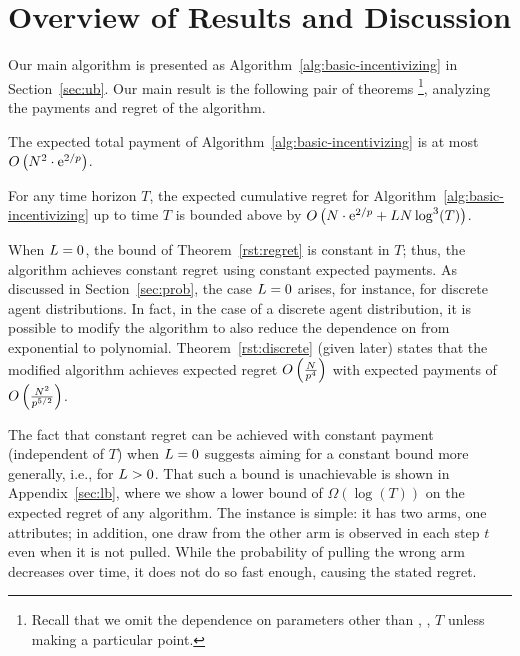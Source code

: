 \section{Overview of Results and Discussion}

Our main algorithm is presented as
Algorithm~\ref{alg:basic-incentivizing}
in Section~\ref{sec:ub}.
Our main result is the following pair of theorems%
\footnote{Recall that we omit the dependence on parameters other than
  \ARMNUM, \MinProb, $T$ unless making a particular point.},
analyzing the payments and regret of the algorithm.

\begin{theorem} \label{rst:budget}
The expected total payment of
Algorithm~\ref{alg:basic-incentivizing} is at most
$O \left(N^2 \cdot \mathrm{e}^{2/p} \right)$.
\end{theorem}

\begin{theorem} \label{rst:regret}
For any time horizon $T$, the expected cumulative regret for
Algorithm~\ref{alg:basic-incentivizing} up to time $T$ is bounded
above by 
$O \left(N \cdot \mathrm{e}^{2/p} + L N \log^3(T) \right)$.
\end{theorem}

When $L = 0$, the bound of Theorem~\ref{rst:regret} is
constant in $T$;
thus, the algorithm achieves constant regret using constant
expected payments. 
As discussed in Section~\ref{sec:prob},
the case $L = 0$ arises, for instance, for
discrete agent distributions.
In fact, in the case of a discrete agent distribution,
it is possible to modify the algorithm to also
reduce the dependence on \MinProb from exponential to polynomial.
Theorem~\ref{rst:discrete} (given later) states that the modified
algorithm achieves expected regret
$O \left(\frac{N}{p^4} \right)$
with expected payments of
$O \left(\frac{N^2}{p^{5/2}} \right)$.

The fact that constant regret can be achieved with constant payment
(independent of $T$) when $L = 0$ suggests aiming for a
constant bound more generally, i.e., for $L > 0$.
That such a bound is unachievable is shown in Appendix~\ref{sec:lb},
where we show a lower bound of $\Omega(\log(T))$ on
the expected regret of any algorithm.
The instance is simple: it has two arms, one 
attributes; 
in addition, one draw from the other arm is observed in
each step $t$ even when it is not pulled.
While the probability of pulling the wrong arm decreases over time, it
does not do so fast enough, causing the stated regret.

